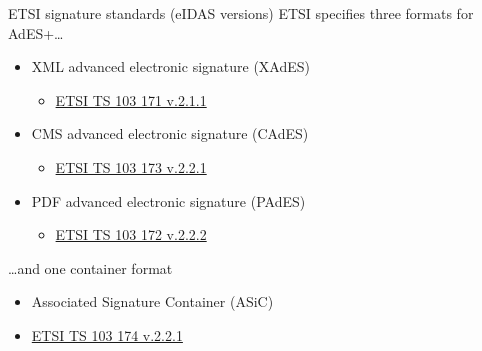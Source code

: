 \begin{frame}{ETSI signature standards (eIDAS versions)}
  ETSI specifies three formats for AdES+\dots
  \begin{itemize}[<+(1)->]
    \item XML advanced electronic signature (XAdES)
    \begin{itemize}
      \item \href{http://www.etsi.org/deliver/etsi_ts/103100_103199/103171/02.01.01_60/ts_103171v020101p.pdf}{ETSI TS 103 171 v.2.1.1}
    \end{itemize}
    \item CMS advanced electronic signature (CAdES)
    \begin{itemize}
      \item \href{http://www.etsi.org/deliver/etsi_ts/103100_103199/103173/02.02.01_60/ts_103173v020201p.pdf}{ETSI TS 103 173 v.2.2.1}
    \end{itemize}
    \item PDF advanced electronic signature (PAdES)
    \begin{itemize}
      \item \href{http://www.etsi.org/deliver/etsi_ts/103100_103199/103172/02.02.02_60/ts_103172v020202p.pdf}{ETSI TS 103 172 v.2.2.2}
    \end{itemize}
  \end{itemize}

  \pause
  \dots and one container format
  \pause
  \begin{itemize}
    \item Associated Signature Container (ASiC)
    \item \href{http://www.etsi.org/deliver/etsi_ts/103100_103199/103174/02.02.01_60/ts_103174v020201p.pdf}{ETSI TS 103 174 v.2.2.1}
  \end{itemize}
\end{frame}

